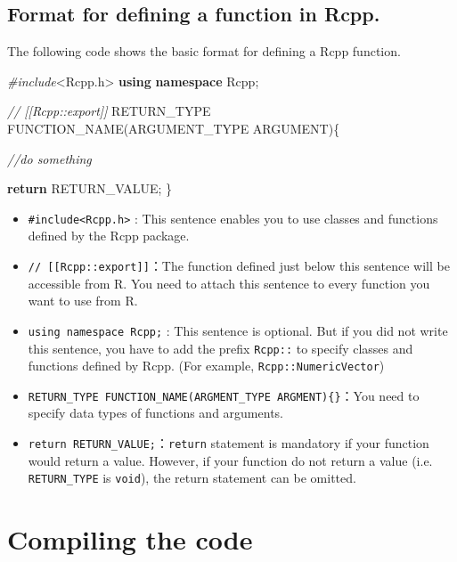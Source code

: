 \documentclass[]{book}
\newenvironment{Shaded}{\begin{snugshade}}{\end{snugshade}}
\newcommand{\CommentTok}[1]{\textcolor[rgb]{0.56,0.35,0.01}{\textit{#1}}}
\newcommand{\ControlFlowTok}[1]{\textcolor[rgb]{0.13,0.29,0.53}{\textbf{#1}}}
\newcommand{\ImportTok}[1]{#1}
\newcommand{\KeywordTok}[1]{\textcolor[rgb]{0.13,0.29,0.53}{\textbf{#1}}}
\newcommand{\NormalTok}[1]{#1}
\newcommand{\PreprocessorTok}[1]{\textcolor[rgb]{0.56,0.35,0.01}{\textit{#1}}}
\begin{document}
\hypertarget{format-for-defining-a-function-in-rcpp.}{%
\subsection{Format for defining a function in Rcpp.}\label{format-for-defining-a-function-in-rcpp.}}

The following code shows the basic format for defining a Rcpp function.

\begin{Shaded}
\begin{Highlighting}[]
\PreprocessorTok{#include}\ImportTok{<Rcpp.h>}
\KeywordTok{using} \KeywordTok{namespace}\NormalTok{ Rcpp;}

\CommentTok{// [[Rcpp::export]]}
\NormalTok{RETURN_TYPE FUNCTION_NAME(ARGUMENT_TYPE ARGUMENT)\{}

    \CommentTok{//do something}

    \ControlFlowTok{return}\NormalTok{ RETURN_VALUE;}
\NormalTok{\}}
\end{Highlighting}
\end{Shaded}

\begin{itemize}
\item
  \texttt{\#include\textless{}Rcpp.h\textgreater{}} : This sentence enables you to use classes and functions defined by the Rcpp package.
\item
  \texttt{//\ {[}{[}Rcpp::export{]}{]}}：The function defined just below this sentence will be accessible from R. You need to attach this sentence to every function you want to use from R.
\item
  \texttt{using\ namespace\ Rcpp;} : This sentence is optional. But if you did not write this sentence, you have to add the prefix \texttt{Rcpp::} to specify classes and functions defined by Rcpp. (For example, \texttt{Rcpp::NumericVector})
\item
  \texttt{RETURN\_TYPE\ FUNCTION\_NAME(ARGMENT\_TYPE\ ARGMENT)\{\}}：You need to specify data types of functions and arguments.
\item
  \texttt{return\ RETURN\_VALUE;}：\texttt{return} statement is mandatory if your function would return a value. However, if your function do not return a value (i.e. \texttt{RETURN\_TYPE} is \texttt{void}), the return statement can be omitted.
\end{itemize}

\hypertarget{compiling-the-code}{%
\section{Compiling the code}\label{compiling-the-code}}
\end{document}
